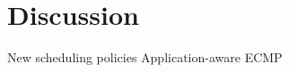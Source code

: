 \section{Discussion}\label{s:discussion}

\begin{outline}
\1 New scheduling policies
    \2 Application-aware
\1 ECMP
\end{outline}
